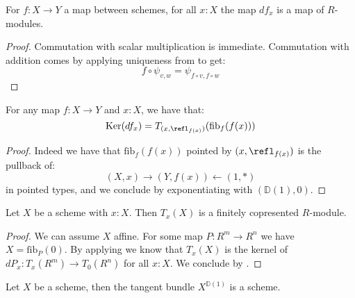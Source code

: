\begin{lemma}
For $f:X\to Y$ a map between schemes, for all $x:X$ the map $df_x$ is a map of $R$-modules.
\end{lemma}

\begin{proof}
Commutation with scalar multiplication is immediate. Commutation with addition comes by applying uniqueness from  to get:
\[f\circ \psi_{v,w} = \psi_{f\circ v,f\circ w}\]
\end{proof}

\begin{lemma}\label{kernel-is-tangent-of-fibers}
For any map $f:X\to Y$ and $x:X$, we have that:
\[
\mathrm{Ker}(df_x) = T_{(x,\refl_{f(x)})}(\mathrm{fib}_f(f(x)))
\]
\end{lemma}

\begin{proof}
Indeed we have that $\mathrm{fib}_f(f(x))$ pointed by $(x,\refl_{f(x)})$ is the pullback of:
\[
(X,x) \to (Y,f(x)) \leftarrow (1,*)
\]
in pointed types, and we conclude by exponentiating with $(\mathbb{D}(1),0)$.
\end{proof}

\begin{lemma}\label{tangent-finite-copresented}
Let $X$ be a scheme with $x : X$. Then $T_x(X)$ is a finitely
copresented $R$-module.
\end{lemma}

\begin{proof}
We can assume $X$ affine. For some map $P: R^m\to R^n$ we have $X=\mathrm{fib}_P(0)$.
By applying  we know that $T_x(X)$ is the kernel of $dP_x : T_x(R^m)\to T_0(R^n)$ for all $x:X$.
We conclude by .
\end{proof}

\begin{corollary}
  \label{tangent-bundle-scheme}
  Let $X$ be a scheme, then the tangent bundle $X^{\mathbb{D}(1)}$ is a scheme.
\end{corollary}

